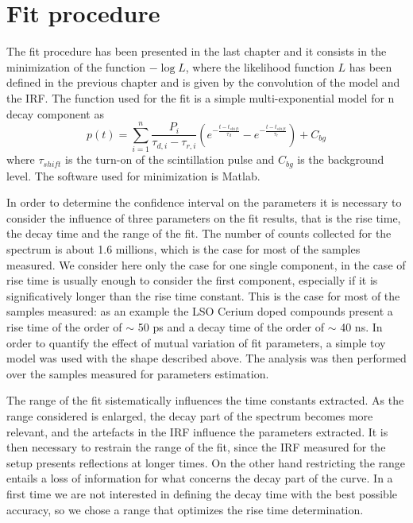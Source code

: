 \section{Fit procedure}
The fit procedure has been presented in the last chapter and it consists in the minimization of the function $-\log{L}$, where the likelihood function $L$ has been defined in the previous chapter and is given by the convolution of the model and the IRF.
The function used for the fit is a simple multi-exponential model for n decay component as
\begin{equation}
p(t) = \sum _{i = 1}^{n} \frac{P_{i}}{\tau _{d, i} - \tau _{r, i}}\left( e^{-\frac{t-t_{shift}}{\tau _{d}}} - e^{-\frac{t-t_{shift}}{\tau _{r}}} \right) + C_{bg}
\end{equation}
where $\tau _{shift}$ is the turn-on of the scintillation pulse and $C_{bg}$ is the background level.
The software used for minimization is Matlab.

In order to determine the confidence interval on the parameters it is necessary to consider the influence of three parameters on the fit results, that is the rise time, the decay time and the range of the fit. 
The number of counts collected for the spectrum is about 1.6 millions, which is the case for most of the samples measured. 
We consider here only the case for one single component, in the case of rise time is usually enough to consider the first component, especially if it is significatively longer than the rise time constant. This is the case for most of the samples measured: as an example the LSO Cerium doped compounds present a rise time of the order of $\sim$ 50 ps and a decay time of the order of $\sim$ 40 ns.
In order to quantify the effect of mutual variation of fit parameters, a simple toy model was used with the shape described above. The analysis was then performed over the samples measured for parameters estimation.

The range of the fit sistematically influences the time constants extracted. As the range considered is enlarged, the  decay part of the spectrum becomes more relevant, and the artefacts in the IRF influence the parameters extracted. 
It is then necessary to restrain the range of the fit, since the IRF measured for the setup presents reflections at longer times. On the other hand restricting the range  entails a loss of information for what concerns the decay part of the curve. In a first time we are not interested in defining the decay time with the best possible accuracy, so we chose a range that optimizes the rise time determination.

